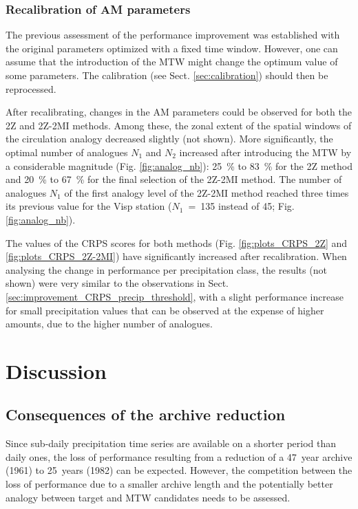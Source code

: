 \documentclass[hess, manuscript]{copernicus}
\begin{document}
	
	\subsubsection{Recalibration of AM parameters}
	\label{sec:recalibration}
	
	The previous assessment of the performance improvement was established with the original parameters optimized with a fixed time window. However, one can assume that the introduction of the MTW might change the optimum value of some parameters. The calibration (see Sect. \ref{sec:calibration}) should then be reprocessed.
	
	After recalibrating, changes in the AM parameters could be observed for both the 2Z and 2Z-2MI methods. Among these, the zonal extent of the spatial windows of the circulation analogy decreased slightly (not shown). More significantly, the optimal number of analogues $N_{1}$ and $N_{2}$ increased after introducing the MTW by a considerable magnitude (Fig. \ref{fig:analog_nb}): 25~\% to 83~\% for the 2Z method and 20~\% to 67~\% for the final selection of the 2Z-2MI method. The number of analogues $N_{1}$ of the first analogy level of the 2Z-2MI method reached three times its previous value for the Visp station ($N_{1}$~=~135 instead of 45; Fig. \ref{fig:analog_nb}). 
	
	The values of the CRPS scores for both methods (Fig. \ref{fig:plots_CRPS_2Z} and \ref{fig:plots_CRPS_2Z-2MI}) have significantly increased after recalibration. When analysing the change in performance per precipitation class, the results (not shown) were very similar to the observations in Sect. \ref{sec:improvement_CRPS_precip_threshold}, with a slight performance increase for small precipitation values that can be observed at the expense of higher amounts, due to the higher number of analogues.
	

	
	
	\section{Discussion}
	\label{sec:discussion}
	
	
		
	\subsection{Consequences of the archive reduction}
	\label{sec:archive_reduction}
	
	
	
	Since sub-daily precipitation time series are available on a shorter period than daily ones, the loss of performance resulting from a reduction of a 47~year archive (1961) to 25~years (1982) can be expected. However, the competition between the loss of performance due to a smaller archive length and the potentially better analogy between target and MTW candidates needs to be assessed.
	
\end{document}
